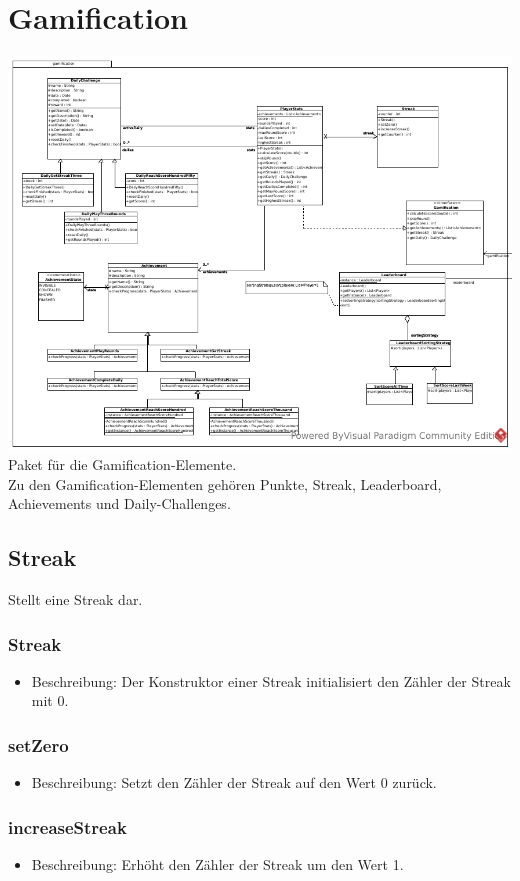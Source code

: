 \documentclass[a4paper]{scrreprt}
\begin{document}
	\section{Gamification}
	\includegraphics[width=\textwidth]{img/package/gamification.pdf}\\
	Paket für die Gamification-Elemente. \\
	Zu den Gamification-Elementen gehören Punkte, Streak, Leaderboard, Achievements und Daily-Challenges.


	\subsection{Streak}
	Stellt eine Streak dar.

	\subsubsection{Streak}
	\begin{itemize}
		\item Beschreibung: Der Konstruktor einer Streak initialisiert den Zähler der Streak mit 0.
	\end{itemize}
	\subsubsection{setZero}
	\begin{itemize}
		\item Beschreibung: Setzt den Zähler der Streak auf den Wert 0 zurück.
	\end{itemize}
	\subsubsection{increaseStreak}
	\begin{itemize}
		\item Beschreibung: Erhöht den Zähler der Streak um den Wert 1.
	\end{itemize}
\end{document}
